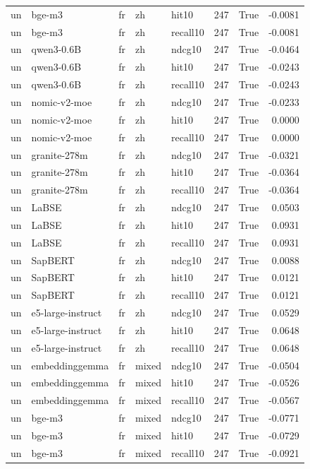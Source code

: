 \begin{tabular}{lllllrrr}
un & bge-m3 & fr & zh & hit10 & 247 & True & -0.0081 \\
un & bge-m3 & fr & zh & recall10 & 247 & True & -0.0081 \\
un & qwen3-0.6B & fr & zh & ndcg10 & 247 & True & -0.0464 \\
un & qwen3-0.6B & fr & zh & hit10 & 247 & True & -0.0243 \\
un & qwen3-0.6B & fr & zh & recall10 & 247 & True & -0.0243 \\
un & nomic-v2-moe & fr & zh & ndcg10 & 247 & True & -0.0233 \\
un & nomic-v2-moe & fr & zh & hit10 & 247 & True & 0.0000 \\
un & nomic-v2-moe & fr & zh & recall10 & 247 & True & 0.0000 \\
un & granite-278m & fr & zh & ndcg10 & 247 & True & -0.0321 \\
un & granite-278m & fr & zh & hit10 & 247 & True & -0.0364 \\
un & granite-278m & fr & zh & recall10 & 247 & True & -0.0364 \\
un & LaBSE & fr & zh & ndcg10 & 247 & True & 0.0503 \\
un & LaBSE & fr & zh & hit10 & 247 & True & 0.0931 \\
un & LaBSE & fr & zh & recall10 & 247 & True & 0.0931 \\
un & SapBERT & fr & zh & ndcg10 & 247 & True & 0.0088 \\
un & SapBERT & fr & zh & hit10 & 247 & True & 0.0121 \\
un & SapBERT & fr & zh & recall10 & 247 & True & 0.0121 \\
un & e5-large-instruct & fr & zh & ndcg10 & 247 & True & 0.0529 \\
un & e5-large-instruct & fr & zh & hit10 & 247 & True & 0.0648 \\
un & e5-large-instruct & fr & zh & recall10 & 247 & True & 0.0648 \\
un & embeddinggemma & fr & mixed & ndcg10 & 247 & True & -0.0504 \\
un & embeddinggemma & fr & mixed & hit10 & 247 & True & -0.0526 \\
un & embeddinggemma & fr & mixed & recall10 & 247 & True & -0.0567 \\
un & bge-m3 & fr & mixed & ndcg10 & 247 & True & -0.0771 \\
un & bge-m3 & fr & mixed & hit10 & 247 & True & -0.0729 \\
un & bge-m3 & fr & mixed & recall10 & 247 & True & -0.0921 \\

\end{tabular}
